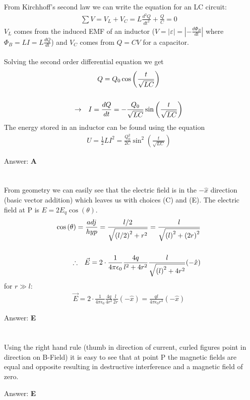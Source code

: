 \documentclass[12pt]{article}
\newcommand{\Answer}[1]{Answer: \textbf{#1}}
\newcommand{\Problem}[3]{
    \setcounter{section}{#1}
    \addtocounter{section}{-1}
    \section{}
    #3\par\par
    \Answer{#2}
}
\begin{document}
\Problem{36}{A}{%
From Kirchhoff's second law we can write the equation for an LC circuit:
\begin{align}
\sum V = V_{L} + V_{C} =  L \frac{d^{2} Q}{dt^{2}} + \frac{Q}{C} = 0
\end{align}
$V_{L}$ comes from the induced EMF of an inductor ($V = |\varepsilon| = \left|-\frac{d \Phi_{B}}{dt}\right|$ where $\Phi_{B} = LI = L \frac{dQ}{dt}$) and $V_{C}$ comes from $Q = CV$ for a capacitor.\\\\
Solving the second order differential equation we get
\begin{gather}
Q = Q_{0} \cos{\left(\frac{t}{\sqrt{LC}}\right)}\nonumber\\
\nonumber\\
\rightarrow \hspace{.1in} I = \frac{dQ}{dt} = -\frac{Q_{0}}{\sqrt{LC}}\sin{\left(\frac{t}{\sqrt{LC}}\right)}\nonumber
\end{gather}
The energy stored in an inductor can be found using the equation
\begin{align}
U = \frac{1}{2}LI^2 = \boxed{\frac{Q_{0}^{2}}{2C}\sin^2{\left(\frac{t}{\sqrt{LC}}\right)}}\nonumber
\end{align}
}

\Problem{37}{E}{%
From geometry we can easily see that the electric field is in the $-\hat{x}$ direction (basic vector addition) which leaves us with choices (C) and (E). The electric field at P is $E =2E_{q}\cos{(\theta)}$.
\begin{align}
\cos{(\theta)} = \frac{adj}{hyp} = \frac{l/2}{\sqrt{{(l/2)}^{2} +r^{2}}} = \frac{l}{\sqrt{{(l)}^{2} +{(2r)}^{2}}}\nonumber\\
\nonumber\\
\therefore \hspace{.1in}\vec{E} = 2 \cdot \frac{1}{4 \pi \epsilon_{0}} \frac{4q}{l^{2} +4r^{2}} \frac{l}{\sqrt{{(l)}^{2} +4r^{2}}}(-\hat{x})\nonumber
\end{align}
for $r \gg l$:
\begin{align}
\vec{E} = 2 \cdot \frac{1}{4 \pi \epsilon_{0}} \frac{4q}{4r^{2}} \frac{l}{{2r}}(-\hat{x}) = \boxed {\frac{ql}{4 \pi \epsilon_{0} r^3}(-\hat{x})}\nonumber
\end{align}
}

\Problem{38}{E}{%
Using the right hand rule (thumb in direction of current, curled figures point in direction on B-Field) it is easy to see that at point P the magnetic fields are equal and opposite resulting in destructive interference and a magnetic field of zero.
}
\end{document}
